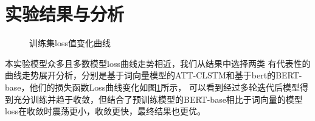 \section{实验结果与分析}

\begin{figure}[htbp]
  \caption{训练集loss值变化曲线}
  \label{fig:loss}
  \end{figure}

本实验模型众多且多数模型loss曲线走势相近，我们从结果中选择两类
有代表性的曲线走势展开分析，分别是基于词向量模型的ATT-CLSTM和基于bert的BERT-base，他们的损失函数Loss曲线变化如图\ref{fig:loss}所示，
可以看到经过多轮迭代后模型得到充分训练并趋于收敛，但结合了预训练模型的BERT-base相比于词向量的模型loss在收敛时震荡更小，收敛更快，最终结果也更优。

